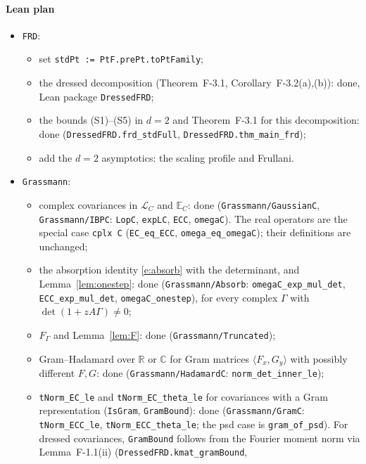 \documentclass[11pt]{amsart}
\theoremstyle{definition}
\theoremstyle{remark}
\numberwithin{equation}{section}
\newcommand{\R}{\mathbb{R}}
\newcommand{\C}{\mathbb{C}}
\newcommand{\E}{\mathbb{E}}
\newcommand{\cL}{\mathcal{L}}
\newcommand{\ip}[2]{\langle #1,#2\rangle}
\begin{document}
\paragraph{Lean plan}
\begin{itemize}
\item \texttt{FRD}:
  \begin{itemize}
  \item set \texttt{stdPt := PtF.prePt.toPtFamily};
  \item the dressed decomposition (Theorem~F-3.1, Corollary~F-3.2(a),(b)): done, Lean
    package \texttt{DressedFRD};
  \item the bounds (S1)--(S5) in $d=2$ and Theorem~F-3.1 for this decomposition: done
    (\texttt{DressedFRD.frd\_stdFull}, \texttt{DressedFRD.thm\_main\_frd});
  \item add the $d=2$ asymptotics: the scaling profile and Frullani.
  \end{itemize}
\item \texttt{Grassmann}:
  \begin{itemize}
  \item complex covariances in $\cL_C$ and $\E_C$: done (\texttt{Grassmann/GaussianC},
    \texttt{Grassmann/IBPC}: \texttt{LopC}, \texttt{expLC}, \texttt{ECC}, \texttt{omegaC}). The
    real operators are the special case \texttt{cplx C} (\texttt{EC\_eq\_ECC},
    \texttt{omega\_eq\_omegaC}); their definitions are unchanged;
  \item the absorption identity \eqref{e:absorb} with the determinant, and
    Lemma~\ref{lem:onestep}: done (\texttt{Grassmann/Absorb}: \texttt{omegaC\_exp\_mul\_det},
    \texttt{ECC\_exp\_mul\_det}, \texttt{omegaC\_onestep}), for every complex $\Gamma$ with
    $\det(1+zA\Gamma)\ne0$;
  \item $F_\Gamma$ and Lemma~\ref{lem:F}: done (\texttt{Grassmann/Truncated});
  \item Gram--Hadamard over $\R$ or $\C$ for Gram matrices $\ip{F_x}{G_y}$ with possibly
    different $F,G$: done (\texttt{Grassmann/HadamardC}: \texttt{norm\_det\_inner\_le});
  \item \texttt{tNorm\_EC\_le} and \texttt{tNorm\_EC\_theta\_le} for covariances with a Gram
    representation (\texttt{IsGram}, \texttt{GramBound}): done (\texttt{Grassmann/GramC}:
    \texttt{tNorm\_ECC\_le}, \texttt{tNorm\_ECC\_theta\_le}; the psd case is
    \texttt{gram\_of\_psd}). For dressed covariances, \texttt{GramBound} follows from the
    Fourier moment norm via Lemma~F-1.1(ii) (\texttt{DressedFRD.kmat\_gramBound},

\end{itemize}
\end{itemize}
\end{document}
